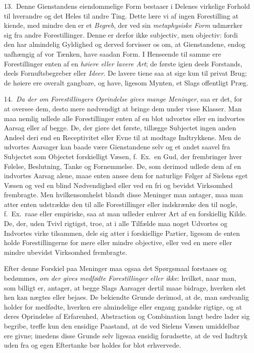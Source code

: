 \documentclass[12pt,a4paper]{article}
\newcommand{\opage}[1]{\marginnote{\footnotesize\textit{[#1]}}}
\begin{document}
13.~Denne Gienstandens eiendommelige Form bestaaer i Delenes virkelige Forhold til
hverandre og det Heles til andre Ting. Dette lære vi af ingen Forestilling at kiende,
med mindre den er et \emph{Begreb}, der ved sin \emph{metaphysiske Form} udmærker sig
fra andre Forestillinger. Denne er derfor ikke subjectiv, men objectiv: fordi den har
almindelig Gyldighed og derved forvisser os om, at Gienstandene, endog uafhængig af
vor Tænken, have saadan Form. I Henseende til samme ere Forestillinger enten af en
\emph{høiere eller lavere Art}; de første igien deels Forstands, deels
Fornuftsbegreber eller \emph{Ideer}. De lavere tiene saa at sige kun til privat Brug;
de høiere ere overalt gangbare, og have, ligesom Mynten, et Slags offentligt Præg.

14.~\emph{Da der om Forestillingers Oprindelse gives mange Meninger}, saa er det, for
at oversee dem, desto mere nødvendigt at bringe dem under visse Klasser. Man maa
nemlig udlede alle Forestillinger enten af en blot udvortes eller en indvortes Aarsag
eller af begge. De, der giøre det første, tillægge Subjectet ingen anden Andeel deri
end en Receptivitet eller Evne til at modtage Indtrykkene. Men de udvortes Aarsager
kan baade være Gienstandene selv og et andet saavel fra Subjectet som Objectet
forskielligt Væsen, f.~Ex.\ en Gud, der frembringer hver Følelse, Beslutning,
\opage{54} Tanke og Fornemmelse. De, som derimod udlede dem af en indvortes Aarsag alene, maae
enten ansee dem for naturlige Følger af Sielens eget Væsen og ved en blind
Nødvendighed eller ved en fri og bevidst Virksomhed frembragte. Men hvilkensomhelst
blandt disse Meninger man antager, maa man atter enten udstrække den til alle
Forestillinger eller indskrænke den til nogle, f.~Ex.\ raae eller empiriske, saa at
man udleder enhver Art af en forskiellig Kilde. De, der, uden Tvivl rigtigst, troe,
at i alle Tilfælde maa noget Udvortes og Indvortes virke tilsammen, dele sig atter i
forskiellige Partier, ligesom de enten holde Forestillingerne for mere eller mindre
objective, eller ved en mere eller mindre ubevidst Virksomhed frembragte.

Efter denne Forskiel paa Meninger maa ogsaa det Spørgsmaal forstaaes og bedømmes,
\emph{om der gives medfødte Forestillinger eller ikke}: hvilket, naar man, som
billigt er, antager, at begge Slags Aarsager dertil maae bidrage, hverken slet hen kan
nægtes eller bejaes. De bekiendte Grunde derimod, at de, man sædvanlig holder for
medfødte, hverken ere almindelige eller engang gandske rigtige, og at deres
Oprindelse af Erfarenhed, Abstraction og Combination langt bedre lader sig begribe,
treffe kun den ensidige Paastand, at de ved Sielens Væsen umiddelbar ere givne;
imedens disse Grunde selv ligesaa ensidig forudsette, at de ved
\opage{55} Indtryk uden fra og egen Eftertanke bør holdes for blot erhvervede.
\end{document}
